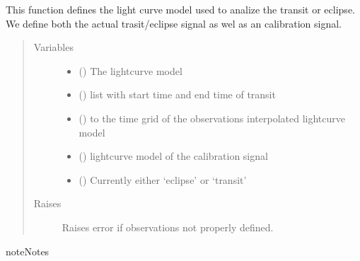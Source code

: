 \documentclass[a4paper,10pt,english]{sphinxmanual}
\begin{document}
\begin{fulllineitems}
\begin{fulllineitems}
\label{\detokenize{cascade.TSO:cascade.TSO.TSO.TSOSuite.define_eclipse_model}}
This function defines the light curve model used to analize the
transit or eclipse. We define both the actual trasit/eclipse signal
as wel as an calibration signal.
\begin{quote}\begin{description}
\item[{Variables}] \leavevmode\begin{itemize}
\item {} 
 () \textendash{} The lightcurve model

\item {} 
 () \textendash{} list with start time and end time of transit

\item {} 
 () \textendash{} to the time grid of the observations interpolated lightcurve model

\item {} 
 () \textendash{} lightcurve model of the calibration signal

\item {} 
 () \textendash{} Currently either ‘eclipse’ or ‘transit’

\end{itemize}

\item[{Raises}] \leavevmode
{} \textendash{} Raises error if observations not properly defined.

\end{description}\end{quote}

\begin{sphinxadmonition}{note}{Notes}


\end{sphinxadmonition}
\end{fulllineitems}
\end{fulllineitems}
\end{document}
